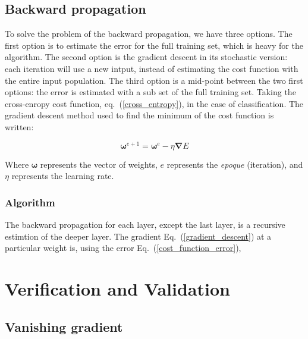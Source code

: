 \documentclass[final, paper=letter,5p,times,twocolumn]{elsarticle}
\begin{document}
\subsection{Backward propagation}

To solve the problem of the backward propagation, we have three options. The first option is to estimate the error for the full training set, which is heavy for the algorithm. The second option is the gradient descent in its stochastic version: each iteration will use a new intput, instead of estimating the cost function with the entire input population. The third option is a mid-point between the two first options: the error is estimated with a sub set of the full training set.
Taking the cross-enropy cost function, eq.~(\ref{cross_entropy}), in the case of classification. The gradient descent method used to find the minimum of the cost function is written:

\begin{equation}
  \bm{\omega}^{e+1} = \bm{\omega}^{e} - \eta \bm{\nabla} E
  \label{gradient_descent}
\end{equation}

Where $\bm{\omega}$ represents the vector of weights, $e$ represents the {\it epoque} (iteration), and $\eta$ represents the learning rate. 


\subsubsection{Algorithm}

The backward propagation for each layer, except the last layer, is a recursive estimtion of the deeper layer. The gradient Eq.~(\ref{gradient_descent}) at a particular weight is, using the error Eq.~(\ref{cost_function_error}),


\section{Verification and Validation}
\lipsum[20-20]

\subsection{Vanishing gradient}
\end{document}
